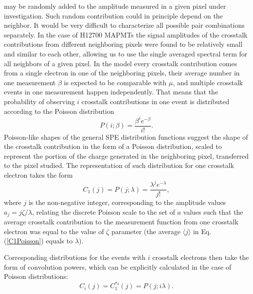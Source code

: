 may be randomly added to the amplitude measured in a given pixel under investigation. Such random contribution could in principle depend on the neighbor. It would be very difficult to characterize all possible pair combinations separately. In the case of H12700 MAPMTs the signal amplitudes of the crosstalk contributions from different neighboring pixels were found to be relatively small and similar to each other, allowing us to use the single averaged spectral term for all neighbors of a given pixel. In the model every crosstalk contribution comes from a single electron in one of the neighboring pixels, their average number in one measurement $\beta$ is expected to be comparable with $\mu$, and multiple crosstalk events in one measurement happen independently. That means that the probability of observing $i$ crosstalk contributions in one event is distributed according to the Poisson distribution
\begin{equation}
\label{CTPoisson}
 P(i;\beta) = \frac{\beta^{i} e^{-\beta}}{i!}.
\end{equation}
Poisson-like shapes of the general SPE distribution functions suggest the shape of the crosstalk contribution in the form of a Poisson distribution, scaled to represent the portion of the charge generated in the neighboring pixel, transferred to the pixel studied. The representation of such distribution for one crosstalk electron takes the form
\begin{equation}
\label{C1Poisson}
 C_1(j) = P(j;\lambda) = \frac{\lambda^{j} e^{-\lambda}}{j!},
\end{equation}
where $j$ is the non-negative integer, corresponding to the amplitude values $a_j = j \zeta / \lambda $, relating the discrete Poisson scale to the set of $a$ values such that the average crosstalk contribution to the measurement function from one crosstalk electron was equal to the value of $\zeta$ parameter (the average $\langle j \rangle$ in Eq. (\ref{C1Poisson}) equals to $\lambda$).

Corresponding distributions for the events with $i$ crosstalk electrons then take the form of convolution powers, which can be explicitly calculated in the case of Poisson distributions: 
\begin{equation}
\label{CiPoisson}
 C_i(j) = C_1^{*i}(j) = P(j;i\lambda).
\end{equation}

